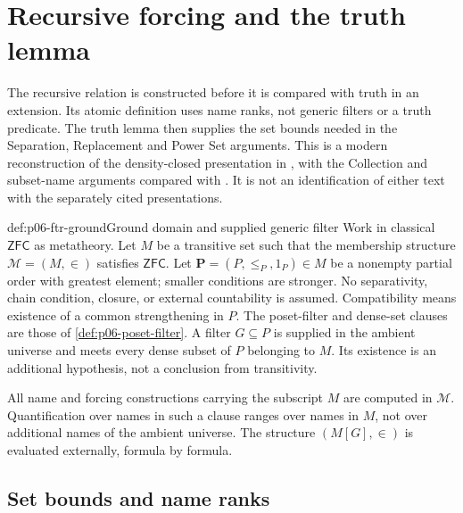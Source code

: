 \section{Recursive forcing and the truth lemma}
\label{sec:p06-forcing-recursion-truth}

The recursive relation is constructed before it is compared with truth in an
extension. Its atomic definition uses name ranks, not generic filters or a
truth predicate. The truth lemma then supplies the set bounds needed in the
Separation, Replacement and Power Set arguments. This is a modern
reconstruction of the density-closed presentation in
\cite[Sections~2.1--2.2, pp.~6--10]{Karagila2026ForcingNotes}, with the
Collection and subset-name arguments compared with
\cite[Sections~10.1--10.3, pp.~26--36]{Unger2014ForcingSummerSchool}.
It is not an identification of either text with the separately cited
\cite{Jech2003,Kunen2011} presentations.

\begin{hbconvention}{def:p06-ftr-ground}{Ground domain and supplied generic filter}
Work in classical \(\mathsf{ZFC}\) as metatheory. Let \(M\) be a transitive
set such that the membership structure \(\mathcal M=(M,\in)\) satisfies
\(\mathsf{ZFC}\). Let \(\mathbf P=(P,\leq_P,1_P)\in M\) be a nonempty
partial order with greatest element; smaller conditions are stronger.
No separativity, chain condition, closure, or external countability is assumed.
Compatibility means existence of a common strengthening in \(P\).
The poset-filter and dense-set clauses are those of
\cref{def:p06-poset-filter}. A filter \(G\subseteq P\) is supplied in the
ambient universe and meets every dense subset of \(P\) belonging to \(M\).
Its existence is an additional hypothesis, not a conclusion from transitivity.

All name and forcing constructions carrying the subscript \(M\) are computed
in \(\mathcal M\). Quantification over names in such a clause ranges over
names in \(M\), not over additional names of the ambient universe. The
structure \((M[G],\in)\) is evaluated externally, formula by formula.
\end{hbconvention}

\subsection{Set bounds and name ranks}

